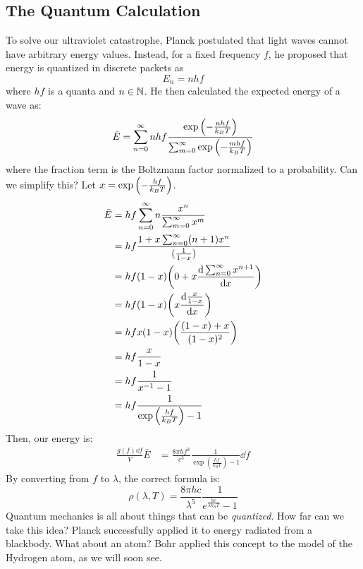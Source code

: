 \subsection{The Quantum Calculation}
To solve our ultraviolet catastrophe, Planck postulated that light waves cannot have arbitrary energy values. Instead, for a fixed frequency $f$, he proposed that energy
is quantized in discrete packets as
\[ E_n = nhf \]
where $hf$ is a quanta and $n \in \operatorname{\mathbb{N}}$. He then calculated the expected energy of a wave as:
\begin{align*}
    \bar{E} = \sum_{n = 0}^{\infty} nhf \frac{\exp\qty(- \frac{nhf}{k_B T})}{\sum_{m = 0}^{\infty} \exp\qty(- \frac{mhf}{k_B T})}
\end{align*}
where the fraction term is the Boltzmann factor normalized to a probability. Can we simplify this? Let $x = \exp\qty(- \frac{hf}{k_B T})$.
\begin{align*}
    \bar{E} &= hf \sum_{n = 0}^{\infty} n \frac{x^n}{\sum_{m = 0}^{\infty} x^m} \\
    &= hf \frac{1 + x \sum_{n = 0}^{\infty} (n + 1) x^n}{(\frac{1}{1 - x})} \\
    &= hf (1 - x) \qty(0 + x \derivative{\sum_{n = 0}^{\infty} x^{n + 1}}{x}) \\
    &= hf (1 - x) \qty(x \derivative{\frac{x}{1 - x}}{x}) \\
    &= hf x(1 - x) \qty(\frac{(1 - x) + x}{(1 - x)^2}) \\
    &= hf \frac{x}{1 - x} \\
    &= hf \frac{1}{x^{-1} - 1} \\
    &= hf \frac{1}{\exp\qty(\frac{hf}{k_B T}) - 1}
\end{align*}
Then, our energy is:
\begin{align*}
    \frac{g(f) \dd{f}}{V} \bar{E} &= \frac{8 \pi h f^3}{c^3} \frac{1}{\exp(\frac{hf}{k_B T}) - 1} \dd{f}
\end{align*}
By converting from $f$ to $\lambda$, the correct formula is:
\[ \rho(\lambda, T) = \frac{8 \pi hc}{\lambda^5} \frac{1}{e^{\frac{hc}{\lambda k_B T}} - 1} \]
Quantum mechanics is all about things that can be \textit{quantized}. How far can we take this idea? Planck successfully
applied it to energy radiated from a blackbody. What about an atom? Bohr applied this concept to the model of the Hydrogen atom,
as we will soon see.
